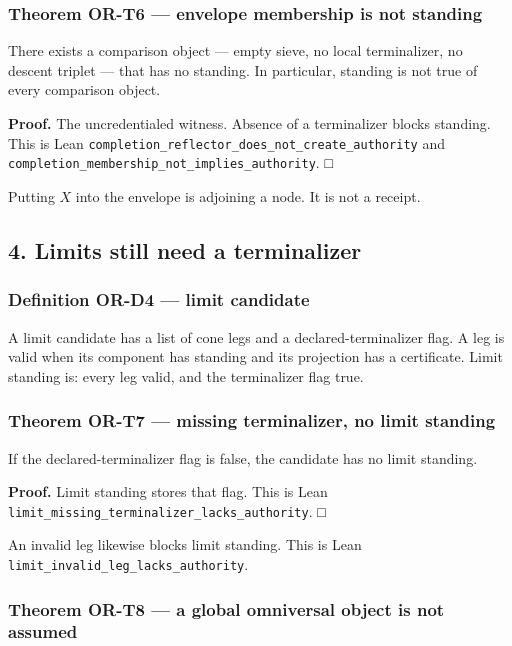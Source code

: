 \documentclass[
  11pt,
]{article}
\begin{document}
\subsubsection{Theorem OR-T6 --- envelope membership is not standing}\label{theorem-or-t6-envelope-membership-is-not-standing}

There exists a comparison object --- empty sieve, no local terminalizer, no descent triplet --- that has no standing. In particular, standing is not true of every comparison object.

\textbf{Proof.} The uncredentialed witness. Absence of a terminalizer blocks standing. This is Lean \nolinkurl{completion_reflector_does_not_create_authority} and \nolinkurl{completion_membership_not_implies_authority}. □

Putting \(X\) into the envelope is adjoining a node. It is not a receipt.

\subsection{4. Limits still need a terminalizer}\label{limits-still-need-a-terminalizer}

\subsubsection{Definition OR-D4 --- limit candidate}\label{definition-or-d4-limit-candidate}

A limit candidate has a list of cone legs and a declared-terminalizer flag. A leg is valid when its component has standing and its projection has a certificate. Limit standing is: every leg valid, and the terminalizer flag true.

\subsubsection{Theorem OR-T7 --- missing terminalizer, no limit standing}\label{theorem-or-t7-missing-terminalizer-no-limit-standing}

If the declared-terminalizer flag is false, the candidate has no limit standing.

\textbf{Proof.} Limit standing stores that flag. This is Lean \nolinkurl{limit_missing_terminalizer_lacks_authority}. □

An invalid leg likewise blocks limit standing. This is Lean \nolinkurl{limit_invalid_leg_lacks_authority}.

\subsubsection{Theorem OR-T8 --- a global omniversal object is not assumed}\label{theorem-or-t8-a-global-omniversal-object-is-not-assumed}
\end{document}
